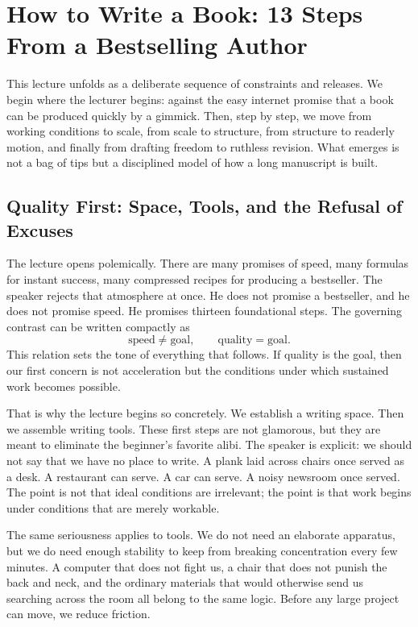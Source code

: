 \chapter{How to Write a Book: 13 Steps From a Bestselling Author}

This lecture unfolds as a deliberate sequence of constraints and releases. We begin where the lecturer begins: against the easy internet promise that a book can be produced quickly by a gimmick. Then, step by step, we move from working conditions to scale, from scale to structure, from structure to readerly motion, and finally from drafting freedom to ruthless revision. What emerges is not a bag of tips but a disciplined model of how a long manuscript is built.

\section{Quality First: Space, Tools, and the Refusal of Excuses}

The lecture opens polemically. There are many promises of speed, many formulas for instant success, many compressed recipes for producing a bestseller. The speaker rejects that atmosphere at once. He does not promise a bestseller, and he does not promise speed. He promises thirteen foundational steps. The governing contrast can be written compactly as
\begin{equation}
\text{speed} \neq \text{goal}, \qquad \text{quality} = \text{goal}.
\end{equation}
This relation sets the tone of everything that follows. If quality is the goal, then our first concern is not acceleration but the conditions under which sustained work becomes possible.

That is why the lecture begins so concretely. We establish a writing space. Then we assemble writing tools. These first steps are not glamorous, but they are meant to eliminate the beginner's favorite alibi. The speaker is explicit: we should not say that we have no place to write. A plank laid across chairs once served as a desk. A restaurant can serve. A car can serve. A noisy newsroom once served. The point is not that ideal conditions are irrelevant; the point is that work begins under conditions that are merely workable.

The same seriousness applies to tools. We do not need an elaborate apparatus, but we do need enough stability to keep from breaking concentration every few minutes. A computer that does not fight us, a chair that does not punish the back and neck, and the ordinary materials that would otherwise send us searching across the room all belong to the same logic. Before any large project can move, we reduce friction.

